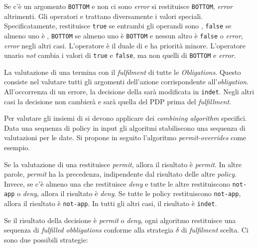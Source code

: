 Se c'è un argomento \texttt{BOTTOM} e non ci sono \emph{error} si restituisce \texttt{BOTTOM}, \emph{error} altrimenti.
Gli operatori \eand e \eor trattano diversamente i valori speciali. Specificatamente, \eand restituisce \texttt{true} se entrambi
gli operandi sono \etrue, \texttt{false} se almeno uno è \efalse, \texttt{BOTTOM} se almeno uno è \texttt{BOTTOM} e nessun altro è
\texttt{false} o \emph{error}, \emph{error} negli altri casi. L'operatore \eor è il duale di \eand e ha priorità minore.
L'operatore unario \emph{not} cambia i valori di \texttt{true} e \texttt{false}, ma non quelli di \texttt{BOTTOM} e \emph{error}.\par
La valutazione di una \epolicy termina con il \emph{fulfilment} di tutte le \emph{Obligations}. Questo consiste nel valutare
tutti gli argomenti dell'azione corrispondente all'\emph{obligation}. All'occorrenza di un errore, la decisione della \epolicy
sarà modificata in \texttt{indet}.
Negli altri casi la decisione non cambierà e sarà quella del \ac{PDP} prima del \emph{fulfillment}.\par
Per valutare gli insiemi di \epolicy si devono applicare dei \emph{combining algorithm} specifici. Data una sequenza di
policy in input gli algoritmi stabiliscono una sequenza di valutazioni per le \epolicy date. Si propone in seguito l'algoritmo
\emph{permit-overrides} come esempio.
\begin{description}[labelindent=5pt,style=multiline,leftmargin=3cm]
\item[permit-overrides]
                        Se la valutazione di una \epolicy restituisce \emph{permit}, allora il risultato è \emph{permit}.
                        In altre parole, \emph{permit} ha la precedenza, indipendente dal risultato delle altre \emph{policy}.
                        Invece, se c'è almeno una \epolicy che restituisce \emph{deny} e tutte le altre restituiscono
                        \texttt{not-app} o \emph{deny}, allora il risultato è \emph{deny}. Se tutte le policy restituiscono
                        \texttt{not-app}, allora il risultato è \texttt{not-app}. In tutti gli altri casi, il risultato è \texttt{indet}.
\end{description}
Se il risultato della decisione è \emph{permit} o \emph{deny}, ogni algoritmo restituisce una sequenza di \emph{fulfilled obbligations}
conforme alla strategia $\delta$ di \emph{fulfilment} scelta. Ci sono due possibili strategie:
